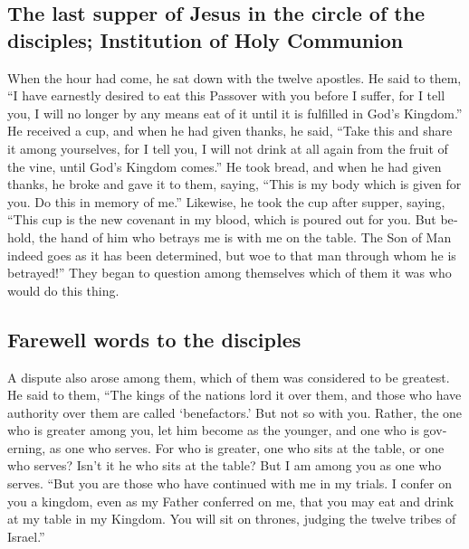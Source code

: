 \begin{paracol}{2}
\begin{otherlanguage}{english}
\begin{otherlanguage}{english}
\hypertarget{the-last-supper-of-jesus-in-the-circle-of-the-disciples-institution-of-holy-communion}{%
\subsection{The last supper of Jesus in the circle of the disciples;
Institution of Holy
Communion}\label{the-last-supper-of-jesus-in-the-circle-of-the-disciples-institution-of-holy-communion}}

 When the hour had come, he sat down with the twelve
apostles.  He said to them, ``I have earnestly desired to
eat this Passover with you before I suffer,  for I tell
you, I will no longer by any means eat of it until it is fulfilled in
God's Kingdom.''  He received a cup, and when he had
given thanks, he said, ``Take this and share it among yourselves,
 for I tell you, I will not drink at all again from the
fruit of the vine, until God's Kingdom comes.''  He took
bread, and when he had given thanks, he broke and gave it to them,
saying, ``This is my body which is given for you. Do this in memory of
me.''  Likewise, he took the cup after supper, saying,
``This cup is the new covenant in my blood, which is poured out for you.
 But behold, the hand of him who betrays me is with me on
the table.  The Son of Man indeed goes as it has been
determined, but woe to that man through whom he is betrayed!''
 They began to question among themselves which of them it
was who would do this thing.

\hypertarget{farewell-words-to-the-disciples}{%
\subsection{Farewell words to the
disciples}\label{farewell-words-to-the-disciples}}

 A dispute also arose among them, which of them was
considered to be greatest.  He said to them, ``The kings
of the nations lord it over them, and those who have authority over them
are called `benefactors.'  But not so with you. Rather,
the one who is greater among you, let him become as the younger, and one
who is governing, as one who serves.  For who is greater,
one who sits at the table, or one who serves? Isn't it he who sits at
the table? But I am among you as one who serves.  ``But
you are those who have continued with me in my trials.  I
confer on you a kingdom, even as my Father conferred on me,
 that you may eat and drink at my table in my Kingdom.
You will sit on thrones, judging the twelve tribes of Israel.''


\end{otherlanguage}
\end{otherlanguage}
\end{paracol}
